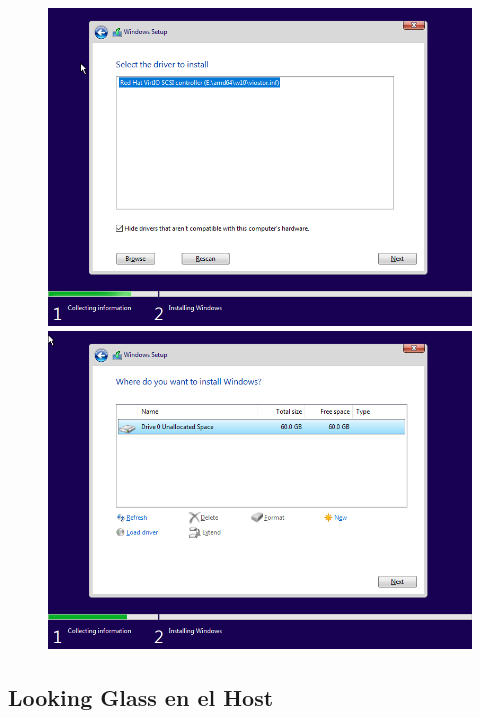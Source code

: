 \documentclass[11pt]{article}
\begin{document}
\begin{figure}[h!]
	\centering
	\begin{minipage}[b]{0.4965\textwidth}
		\includegraphics[width=\textwidth]{images/windows-setup-03.png}
	\end{minipage}
	\begin{minipage}[b]{0.4965\textwidth}
		\includegraphics[width=\textwidth]{images/windows-setup-04.png}
	\end{minipage}
\end{figure}

\subsection{Looking Glass en el Host}
\end{document}
